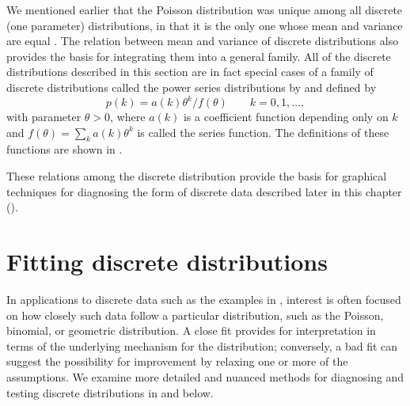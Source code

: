 \documentclass[10pt,krantz2]{krantz}\usepackage[]{graphicx}\usepackage[]{color}
\begin{document}
We mentioned earlier that the Poisson distribution was unique among all discrete (one parameter) distributions, in that it is the only one whose mean and variance are equal
\citep{Kosambi:49}.
The relation between mean and variance of discrete distributions also provides
the basis for integrating them into a general family.
All of the discrete distributions described in this section are in fact
special cases of a family of discrete distributions
called the power series distributions by
\citet{Noack:50}
and defined by
\begin{equation*}
p(k) = a(k) \theta^k / f(\theta)
\quad\quad k=0, 1, \dots \comma
\end{equation*}
with parameter $\theta > 0$,
where $a(k)$ is a coefficient function depending only on $k$
and $f ( \theta) = \sum_k a(k) \theta^k$ is called the series
function.  The definitions of these functions are shown in
.


These relations among the discrete distribution provide the basis for
graphical techniques for diagnosing the form of discrete data described
later in this chapter ().


\section{Fitting discrete distributions}\label{sec:discrete-fit}

In applications to discrete data such as the examples in
, interest is often focused on how closely such data follow a
particular distribution, such as the Poisson, binomial, or geometric
distribution.  A close fit provides for interpretation in terms
of the underlying mechanism for the distribution;  conversely, a
bad fit can suggest the possibility for improvement by relaxing
one or more of the assumptions. We examine more detailed and
nuanced methods for diagnosing and testing discrete distributions
in  and 
below.
\end{document}
